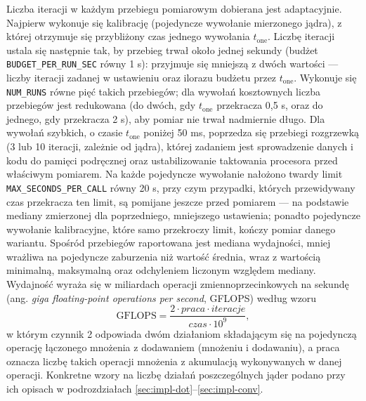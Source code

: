 \documentclass[a4paper,12pt]{book} %
\begin{document}
Liczba iteracji w każdym przebiegu pomiarowym dobierana jest adaptacyjnie. Najpierw wykonuje się kalibrację (pojedyncze wywołanie mierzonego jądra), z której otrzymuje się przybliżony czas jednego wywołania $t_{\mathrm{one}}$. Liczbę iteracji ustala się następnie tak, by przebieg trwał około jednej sekundy (budżet \texttt{BUDGET\_PER\_RUN\_SEC} równy 1 s): przyjmuje się mniejszą z dwóch wartości --- liczby iteracji zadanej w ustawieniu oraz ilorazu budżetu przez $t_{\mathrm{one}}$. Wykonuje się \texttt{NUM\_RUNS} równe pięć takich przebiegów; dla wywołań kosztownych liczba przebiegów jest redukowana (do dwóch, gdy $t_{\mathrm{one}}$ przekracza 0,5 s, oraz do jednego, gdy przekracza 2 s), aby pomiar nie trwał nadmiernie długo. Dla wywołań szybkich, o czasie $t_{\mathrm{one}}$ poniżej 50 ms, poprzedza się przebiegi rozgrzewką (3 lub 10 iteracji, zależnie od jądra), której zadaniem jest sprowadzenie danych i kodu do pamięci podręcznej oraz ustabilizowanie taktowania procesora przed właściwym pomiarem. Na każde pojedyncze wywołanie nałożono twardy limit \texttt{MAX\_SECONDS\_PER\_CALL} równy 20 s, przy czym przypadki, których przewidywany czas przekracza ten limit, są pomijane jeszcze przed pomiarem --- na podstawie mediany zmierzonej dla poprzedniego, mniejszego ustawienia; ponadto pojedyncze wywołanie kalibracyjne, które samo przekroczy limit, kończy pomiar danego wariantu. Spośród przebiegów raportowana jest mediana wydajności, mniej wrażliwa na pojedyncze zaburzenia niż wartość średnia, wraz z wartością minimalną, maksymalną oraz odchyleniem liczonym względem mediany. Wydajność wyraża się w miliardach operacji zmiennoprzecinkowych na sekundę (ang. \emph{giga floating-point operations per second}, GFLOPS) według wzoru
\[
\mathrm{GFLOPS} = \frac{2 \cdot \mathit{praca} \cdot \mathit{iteracje}}{\mathit{czas} \cdot 10^9},
\]
w którym czynnik 2 odpowiada dwóm działaniom składającym się na pojedynczą operację łączonego mnożenia z dodawaniem (mnożeniu i dodawaniu), a praca oznacza liczbę takich operacji mnożenia z akumulacją wykonywanych w danej operacji. Konkretne wzory na liczbę działań poszczególnych jąder podano przy ich opisach w podrozdziałach \ref{sec:impl-dot}--\ref{sec:impl-conv}.
\end{document}
